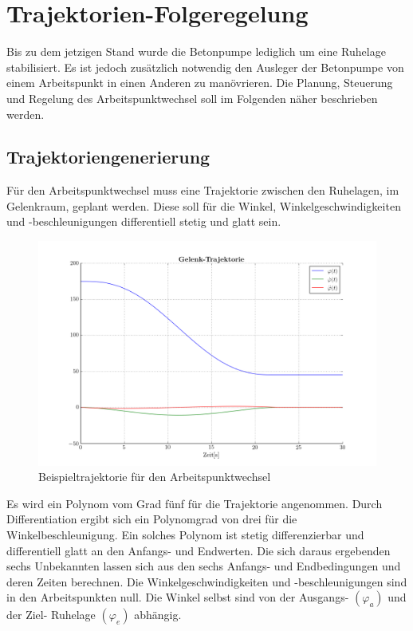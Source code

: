\chapter{Trajektorien-Folgeregelung}
Bis zu dem jetzigen Stand wurde die Betonpumpe lediglich um eine Ruhelage stabilisiert. Es ist jedoch zusätzlich notwendig den Ausleger der Betonpumpe von einem Arbeitspunkt in einen Anderen zu manövrieren. Die Planung, Steuerung und Regelung des Arbeitspunktwechsel soll im Folgenden näher beschrieben werden. 
\section{Trajektoriengenerierung}
Für den Arbeitspunktwechsel muss eine Trajektorie zwischen den Ruhelagen, im Gelenk\-raum, geplant werden. Diese soll für die Winkel, Winkelgeschwindigkeiten und -beschleuni\-gungen differentiell stetig und glatt sein. \newline
	\begin{figure}[h!]
		\centering
		\includegraphics[scale=0.47]{Bilder/Trajektoriengenerierung.png}
		\caption{Beispieltrajektorie für den Arbeitspunktwechsel}
		\label{fig:Trajektoriengenerierung}
	\end{figure}\newline
Es wird ein Polynom vom Grad fünf für die Trajektorie angenommen. Durch Differentiation ergibt sich ein Polynomgrad von drei für die Winkelbeschleunigung. Ein solches Polynom ist stetig differenzierbar und differentiell glatt an den Anfangs- und Endwerten. Die sich daraus ergebenden sechs Unbekannten lassen sich aus den sechs Anfangs- und Endbedingungen und deren Zeiten berechnen. Die Winkelgeschwindigkeiten und -beschleunigungen sind in den Arbeitspunkten null. Die Winkel selbst sind von der Ausgangs- $(\varphi_a)$ und der Ziel- Ruhelage $(\varphi_e)$ abhängig.\newline
